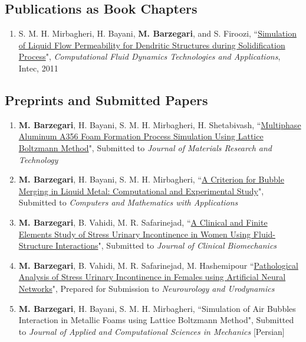 \documentclass{cv}
\begin{document}
\subsection{Publications as Book Chapters}

\begin{enumerate}
\item
S. M. H. Mirbagheri, H. Bayani, \textbf{M. Barzegari}, and S. Firoozi, ``\href{https://www.intechopen.com/books/computational-fluid-dynamics-technologies-and-applications/simulation-of-liquid-flow-permeability-for-dendritic-structures-during-solidification-process}{Simulation of Liquid Flow Permeability for Dendritic Structures during Solidification Process}", \textit{Computational Fluid Dynamics Technologies and Applications}, Intec, 2011
\end{enumerate}

\subsection{Preprints and Submitted Papers}
\begin{enumerate}
\item
\textbf{M. Barzegari}, H. Bayani, S. M. H. Mirbagheri, H. Shetabivash, ``\href{https://arxiv.org/abs/1708.01613}{Multiphase Aluminum A356 Foam Formation Process Simulation Using Lattice Boltzmann Method}", Submitted to \textit{Journal of Materials Research and Technology}
\item
\textbf{M. Barzegari}, H. Bayani, S. M. H. Mirbagheri, ``\href{https://arxiv.org/abs/1708.01608}{A Criterion for Bubble Merging in Liquid Metal: Computational and Experimental Study}", Submitted to \textit{Computers and Mathematics with Applications}
\item
\textbf{M. Barzegari}, B. Vahidi, M. R. Safarinejad, ``\href{https://arxiv.org/abs/1708.01601}{A Clinical and Finite Elements Study of Stress Urinary Incontinence in Women Using Fluid-Structure Interactions}", Submitted to \textit{Journal of Clinical Biomechanics}
\item
\textbf{M. Barzegari}, B. Vahidi, M. R. Safarinejad, M. Hashemipour ``\href{https://arxiv.org/abs/1803.01843}{Pathological Analysis of Stress Urinary Incontinence in Females using Artificial Neural Networks}", Prepared for Submission to \textit{Neurourology and Urodynamics}
\item
\textbf{M. Barzegari}, H. Bayani, S. M. H. Mirbagheri, ``Simulation of Air Bubbles Interaction in Metallic Foams using Lattice Boltzmann Method", Submitted to \textit{Journal of Applied and Computational Sciences in Mechanics} [Persian]
\end{enumerate}
\end{document}
